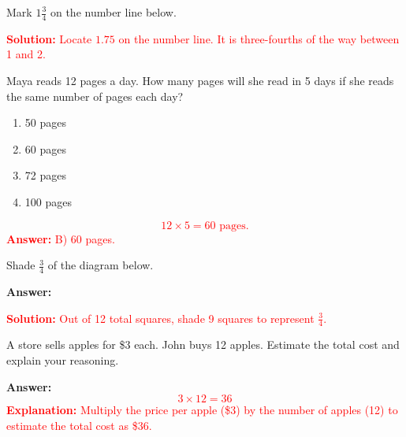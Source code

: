 \documentclass[12pt]{article}
\begin{document}
\begin{tcolorbox}[colframe=black!50, colback=white, title=\textbf{Problem 7}]
Mark \(1\frac{3}{4}\) on the number line below.

\textcolor{red}{\textbf{Solution:} Locate \(1.75\) on the number line. It is three-fourths of the way between 1 and 2.}
\end{tcolorbox}

\begin{tcolorbox}[colframe=black!50, colback=white, title=\textbf{Problem 8}]
Maya reads 12 pages a day. How many pages will she read in 5 days if she reads the same number of pages each day?  

\begin{enumerate}[label=(\Alph*)]
    \item 50 pages
    \item 60 pages
    \item 72 pages
    \item 100 pages
\end{enumerate}

\textcolor{red}{\[
12 \times 5 = 60 \text{ pages.}
\]}  
\textcolor{red}{\textbf{Answer:} B) 60 pages.}
\end{tcolorbox}

\begin{tcolorbox}[colframe=black!50, colback=white, title=\textbf{Problem 9}]
Shade \(\frac{3}{4}\) of the diagram below.

\textbf{Answer:}  
\begin{center}
\end{center}

\textcolor{red}{\textbf{Solution:} Out of 12 total squares, shade 9 squares to represent \(\frac{3}{4}\).}
\end{tcolorbox}

\begin{tcolorbox}[colframe=black!50, colback=white, title=\textbf{Problem 10}]
A store sells apples for \$3 each. John buys 12 apples. Estimate the total cost and explain your reasoning.

\textbf{Answer:}  
\textcolor{red}{\[
3 \times 12 = 36
\]}  
\textcolor{red}{\textbf{Explanation:} Multiply the price per apple (\$3) by the number of apples (12) to estimate the total cost as \$36.}
\end{tcolorbox}
\end{document}
